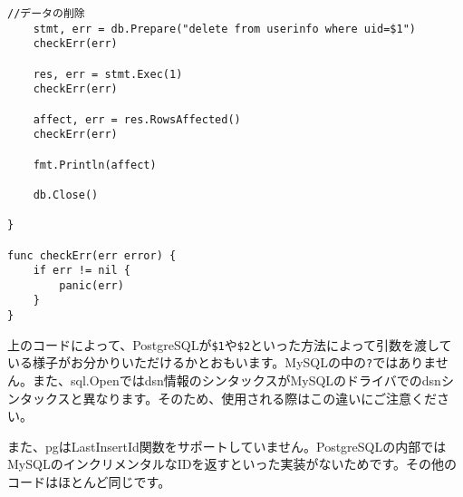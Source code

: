 \begin{lstlisting}[numbers=none]
    //データの削除
    stmt, err = db.Prepare("delete from userinfo where uid=$1")
    checkErr(err)

    res, err = stmt.Exec(1)
    checkErr(err)

    affect, err = res.RowsAffected()
    checkErr(err)

    fmt.Println(affect)

    db.Close()

}

func checkErr(err error) {
    if err != nil {
        panic(err)
    }
}
\end{lstlisting}

上のコードによって、PostgreSQLが\texttt{\$1}や\texttt{\$2}といった方法によって引数を渡している様子がお分かりいただけるかとおもいます。MySQLの中の\texttt{?}ではありません。また、sql.Openではdsn情報のシンタックスがMySQLのドライバでのdsnシンタックスと異なります。そのため、使用される際はこの違いにご注意ください。

また、pgはLastInsertId関数をサポートしていません。PostgreSQLの内部ではMySQLのインクリメンタルなIDを返すといった実装がないためです。その他のコードはほとんど同じです。
